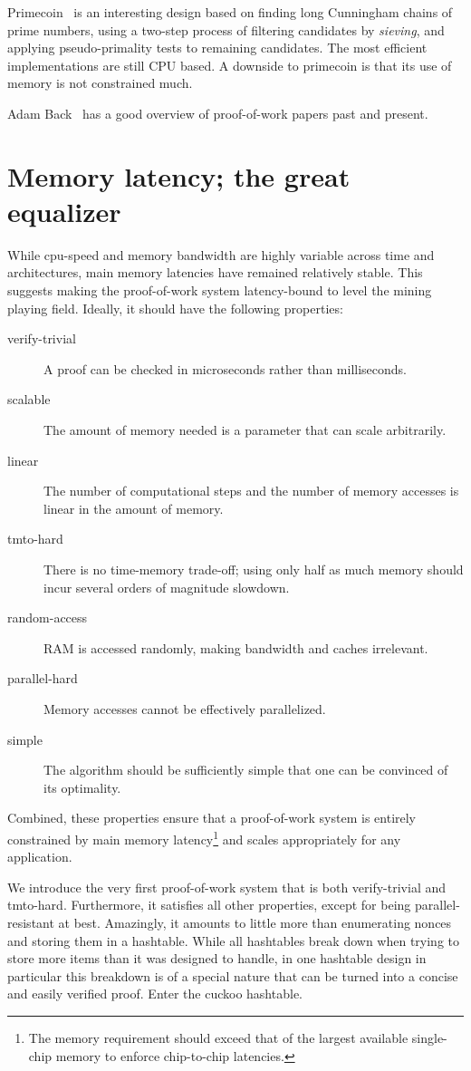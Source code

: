 \documentclass[11pt, oneside]{article}
\begin{document}
Primecoin~\cite{king2013} is an interesting design based on finding long Cunningham chains
of prime numbers, using a two-step process of filtering candidates by {\em sieving}, and applying
pseudo-primality tests to remaining candidates. The most efficient implementations are still CPU based.
A downside to primecoin is that its use of memory is not constrained much.

Adam Back~\cite{back2014} has a good overview of proof-of-work papers past and present.

\section{Memory latency; the great equalizer}
While cpu-speed and memory bandwidth are highly variable across time and architectures,
main memory latencies have remained relatively stable.
This suggests making the proof-of-work system latency-bound to level the mining playing field.
Ideally, it should have the following properties:
\begin{description}
\item[verify-trivial] A proof can be checked in microseconds rather than milliseconds.
\item[scalable] The amount of memory needed is a parameter that can scale arbitrarily.
\item[linear] The number of computational steps and the number of memory accesses is linear in the amount of memory.
\item[tmto-hard] There is no time-memory trade-off; using only half as much memory should
incur several orders of magnitude slowdown.
\item[random-access] RAM is accessed randomly, making bandwidth and caches irrelevant.
\item[parallel-hard] Memory accesses cannot be effectively parallelized.
\item[simple] The algorithm should be sufficiently simple that one can be convinced of its optimality.
\end{description}
Combined, these properties ensure that a proof-of-work system is entirely constrained by main
memory latency\footnote{The memory requirement should exceed that of the largest available
single-chip memory to enforce chip-to-chip latencies.} and scales appropriately for any application.

We introduce the very first proof-of-work system that is both verify-trivial
and tmto-hard. Furthermore, it satisfies all other properties,
except for being parallel-resistant at best.
Amazingly, it amounts to little more than enumerating nonces and storing them
in a hashtable. While all hashtables break down when trying to store more items than
it was designed to handle, in one hashtable design in particular this breakdown
is of a special nature that can be turned into a concise and easily verified proof.
Enter the cuckoo hashtable.
\end{document}
